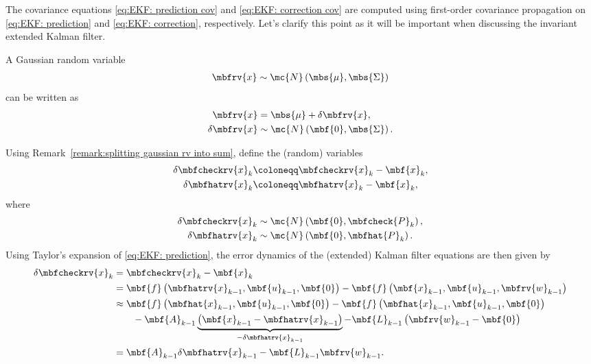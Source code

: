 \documentclass[nobib]{tufte-handout}
\begin{document}
    The covariance equations \eqref{eq:EKF: prediction cov} and \eqref{eq:EKF: correction cov} are computed using first-order covariance propagation on \eqref{eq:EKF: prediction} and \eqref{eq:EKF: correction}, respectively. Let's clarify this point as it will be important when discussing the invariant extended Kalman filter.

    \begin{remark}    
        \label{remark:splitting gaussian rv into sum}
        A Gaussian random variable 
        \begin{align}
            \mbfrv{x}\sim\mc{N}\left( \mbs{\mu}, \mbs{\Sigma} \right)
        \end{align}
        can be written as
        \begin{align}
            \mbfrv{x} &= \mbs{\mu} + \delta\mbfrv{x},\\
            \delta\mbfrv{x} &\sim \mc{N}\left( \mbf{0}, \mbs{\Sigma} \right).
        \end{align}
    \end{remark}
    Using Remark~\ref{remark:splitting gaussian rv into sum}, define the (random) variables
    \begin{align}
        \label{eq:KF: prediction err. def.}
        \delta\mbfcheckrv{x}_{k} &\coloneqq \mbfcheckrv{x}_{k} -  \mbf{x}_{k},\\
        \label{eq:KF: correction err. def.}
        \delta\mbfhatrv{x}_{k} &\coloneqq \mbfhatrv{x}_{k} -  \mbf{x}_{k},
    \end{align}
    where
    \begin{align}
        \delta\mbfcheckrv{x}_{k} &\sim\mc{N}\left( \mbf{0}, \mbfcheck{P}_{k} \right),\\
        \delta\mbfhatrv{x}_{k} &\sim\mc{N}\left( \mbf{0}, \mbfhat{P}_{k} \right).
    \end{align}
    Using Taylor's expansion of \eqref{eq:EKF: prediction}, the error dynamics of the (extended) Kalman filter equations are then given by
    \begin{align}
        \delta\mbfcheckrv{x}_{k} 
        &= \mbfcheckrv{x}_{k} - \mbf{x}_{k} \\
        &= \mbf{f}\left( \mbfhatrv{x}_{k-1}, \mbf{u}_{k-1}, \mbf{0} \right) - \mbf{f}\left( \mbf{x}_{k-1}, \mbf{u}_{k-1}, \mbfrv{w}_{k-1} \right)\\
        &\approx \mbf{f}\left( \mbfhat{x}_{k-1}, \mbf{u}_{k-1}, \mbf{0} \right) - \mbf{f}\left( \mbfhat{x}_{k-1},\mbf{u}_{k-1}, \mbf{0} \right) 
            \nonumber\\&\qquad
            - \mbf{A}_{k-1}\underbrace{\left( \mbf{x}_{k-1} - \mbfhatrv{x}_{k-1} \right)}_{-\delta\mbfhatrv{x}_{k-1}} - \mbf{L}_{k-1}\left( \mbfrv{w}_{k-1} - \mbf{0} \right)\\
        &= \mbf{A}_{k-1}\delta\mbfhatrv{x}_{k-1} - \mbf{L}_{k-1}\mbfrv{w}_{k-1}.
    \end{align}
\end{document}
